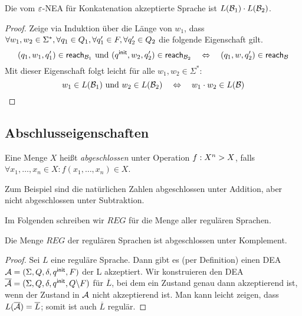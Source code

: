 {\begin{lemma}\label{satz:2.ClosedConcatenation}
Die vom $\varepsilon$-NEA für Konkatenation akzeptierte Sprache ist $L(\mathcal{B}_1)\cdot L(\mathcal{B}_2)$.
\end{lemma}
\begin{proof}
 Zeige via Induktion über die Länge von $w_1$, dass $\forall w_1,w_2\in\Sigma^*, \forall q_1\in Q_1, \linebreak[1] \forall q_1'\in F, \forall q_2'\in Q_2$ die folgende Eigenschaft gilt.
 \[
 (q_1,w_1,q_1')\in\textsf{reach}_{\mathcal{B}_1} \text{ und } (q^\mathsf{init},w_2,q_2')\in\textsf{reach}_{\mathcal{B}_2} \quad\Leftrightarrow\quad (q_1,w,q_2')\in\textsf{reach}_{\mathcal{B}}
 \]
 Mit dieser Eigenschaft folgt leicht für alle $w_1, w_2 \in \Sigma^*$:
 \[
 w_1 \in L(\mathcal{B}_1) \text{ und } w_2 \in L(\mathcal{B}_2) \quad\Leftrightarrow\quad w_1 \cdot w_2 \in L(\mathcal{B})
 \qedhere
 \]
\end{proof}





\subsection{Abschlusseigenschaften}

\begin{Def}[name={[Abgeschlossenheit von $\mathcal{L}$]}]
        Eine Menge $X$ heißt \emph{abgeschlossen} unter Operation $f:X^n \-> X$, falls $\forall x_1,\dots, x_n\in X : f(x_1,\dots, x_n)\in X$.
\end{Def}
Zum Beispiel sind die natürlichen Zahlen abgeschlossen unter Addition, aber nicht abgeschlossen unter Subtraktion.

Im Folgenden schreiben wir $REG$ für die Menge aller regulären Sprachen.

\begin{lemma}\label{satz:2.ClosedComplement}
 Die Menge $REG$ der regulären Sprachen ist abgeschlossen unter Komplement.
\end{lemma}

\begin{proof}
Sei $L$ eine reguläre Sprache. 
Dann gibt es (per Definition) einen \acs*{DEA} $\mathcal{A}=(\Sigma, Q, \delta, q^\mathsf{init}, F)$ der L akzeptiert.
Wir konstruieren den \acs*{DEA} $\overline{\mathcal{A}}=(\Sigma, Q, \delta, q^\mathsf{init}, Q\backslash F)$ für $\overline{L}$, bei dem ein Zustand genau dann akzeptierend ist, wenn der Zustand in $\mathcal{A}$ nicht akzeptierend ist.
Man kann leicht zeigen, dass $L(\overline{\mathcal{A}})=\overline{L}$; somit ist auch $\overline{L}$ regulär.
\end{proof}

}
